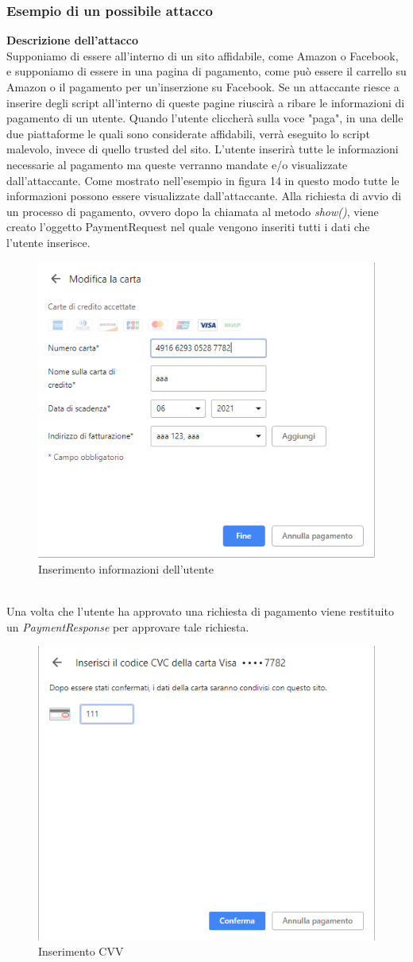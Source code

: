 \documentclass[11pt ,a4paper , twoside , openright ]{article}
\begin{document}
\subsubsection{Esempio di un possibile attacco \cite{rif18}} 
\textbf{Descrizione dell'attacco}
\\
Supponiamo di essere all'interno di un sito affidabile, come Amazon o Facebook, e supponiamo di essere in una pagina di pagamento, come può essere il carrello su Amazon o il pagamento per un'inserzione su Facebook.
Se un attaccante riesce a inserire degli script all'interno di queste pagine riuscirà a ribare le informazioni di pagamento di un utente.
Quando l'utente cliccherà sulla voce "paga", in una delle due piattaforme le quali sono considerate affidabili, verrà eseguito lo script malevolo, invece di quello trusted del sito.
L'utente inserirà tutte le informazioni necessarie al pagamento ma queste verranno mandate e/o visualizzate dall'attaccante.
Come mostrato nell'esempio in figura 14 in questo modo tutte le informazioni possono essere visualizzate dall'attaccante.
Alla richiesta di avvio di un processo di pagamento, ovvero dopo la chiamata al metodo \textit{show()}, viene creato l'oggetto PaymentRequest nel quale vengono inseriti tutti i dati che l'utente inserisce. 
\begin{figure}[h]
	\centering
	\includegraphics[width=0.5\linewidth]{Chrome1}
	\caption{Inserimento informazioni dell'utente}
	\label{fig: Inserimento informazioni dell'utente}
\end{figure}
\\
\pagebreak
Una volta che l'utente ha approvato una richiesta di pagamento viene restituito un \textit{PaymentResponse} per approvare tale richiesta. 
\begin{figure}[h]
	\centering
	\includegraphics[width=0.5\linewidth]{Chrome2}
	\caption{Inserimento CVV}
	\label{fig: Inserimento CVV}
\end{figure}
\end{document}
